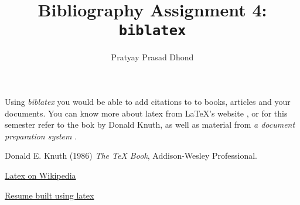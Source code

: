 \documentclass{article}
\title{Bibliography Assignment 4: \texttt{biblatex} }
\author{Pratyay Prasad Dhond}
\date{}
\begin{document}
\maketitle
  Using \textit{biblatex} you would be able to add citations to to books, articles and your documents. You can know more about latex from \LaTeX{}'s website \cite{1}, or for this semester refer to the bok by Donald Knuth\cite{2}, as well as material from
\textit{a document preparation system} \cite{3}.


\begin{thebibliography}{10}
Donald E. Knuth (1986) \textit{The \TeX{} Book}, Addison-Wesley Professional.

\href{https://en.wikipedia.org/wiki/LaTeX}{Latex on Wikipedia}

\href{https://github.com/PratyayDhond/Resume/blob/main/OpenFonts/deedy_resume-openfont.pdf}{Resume built using latex}

\end{thebibliography}
\end{document}
